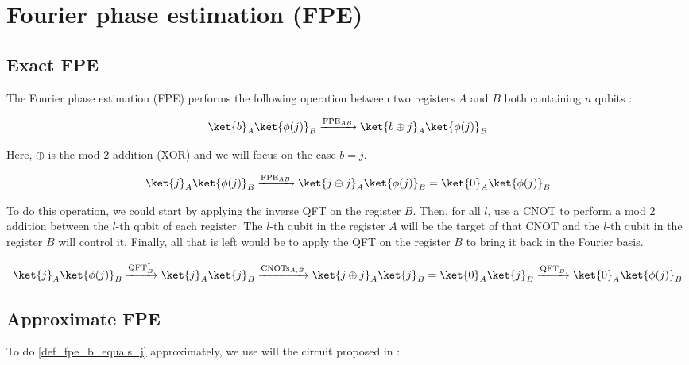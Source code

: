 \newpage
\section{Fourier phase estimation (FPE)}
\subsection{Exact FPE}
The Fourier phase estimation (FPE) performs the following operation between two registers $A$ and $B$ both containing $n$ qubits :

\begin{equation}
    \ket{b}_A\ket{\phi(j)}_B \xrightarrow{\text{FPE}_{AB}} \ket{b \oplus j}_A\ket{\phi(j)}_B
    \label{def_fpe}
\end{equation}

Here, $\oplus$ is the mod 2 addition (XOR) and we will focus on the case $b=j$.

\begin{equation}
    \ket{j}_A\ket{\phi(j)}_B \xrightarrow{\text{FPE}_{AB}} \ket{j \oplus j}_A\ket{\phi(j)}_B = \ket{0}_A\ket{\phi(j)}_B
    \label{def_fpe_b_equals_j}
\end{equation}

To do this operation, we could start by applying the inverse QFT on the register $B$. Then, for all $l$, use a CNOT to perform a mod 2 addition between the $l$-th qubit of each register. The $l$-th qubit in the register $A$ will be the target of that CNOT and the $l$-th qubit in the register $B$ will control it. Finally, all that is left would be to apply the QFT on the register $B$ to bring it back in the Fourier basis.

\begin{equation*}
    \ket{j}_A\ket{\phi(j)}_B \xrightarrow{\text{QFT}^{\dagger}_B} \ket{j}_A\ket{j}_B \xrightarrow{\text{CNOTs}_{A,B}} \ket{j \oplus j}_A\ket{j}_B = \ket{0}_A\ket{j}_B \xrightarrow{\text{QFT}_B} \ket{0}_A\ket{\phi(j)}_B
\end{equation*}

\subsection{Approximate FPE}
To do \ref{def_fpe_b_equals_j} approximately, we use will the circuit proposed in \cite{bäumer2025approximatequantumfouriertransform} :

